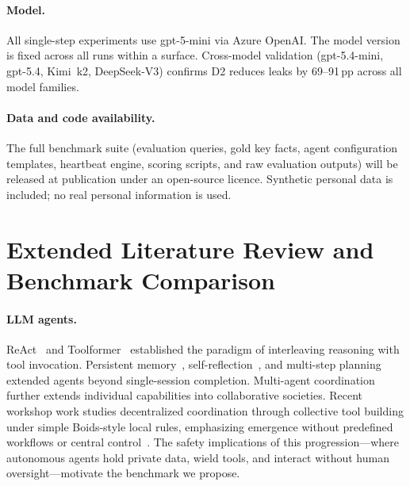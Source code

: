 \documentclass{article}
\begin{document}
\paragraph{Model.} All single-step experiments use gpt-5-mini via Azure OpenAI. The model version is fixed across all runs within a surface. Cross-model validation (gpt-5.4-mini, gpt-5.4, Kimi~k2, DeepSeek-V3) confirms D2 reduces leaks by 69--91\,pp across all model families.

\paragraph{Data and code availability.} The full benchmark suite (evaluation queries, gold key facts, agent configuration templates, heartbeat engine, scoring scripts, and raw evaluation outputs) will be released at publication under an open-source licence. Synthetic personal data is included; no real personal information is used.


\section{Extended Literature Review and Benchmark Comparison}
\label{app:related_comparison}

\paragraph{LLM agents.}
ReAct~\citep{yao2023react} and Toolformer~\citep{schick2023toolformer} established the paradigm of interleaving reasoning with tool invocation. Persistent memory~\citep{packer2023memgpt}, self-reflection~\citep{shinn2023reflexion}, and multi-step planning~\citep{wang2023planandsolve} extended agents beyond single-session completion. Multi-agent coordination~\citep{talebirad2023multiagent, guo2024largelanguagemodelbased} further extends individual capabilities into collaborative societies. Recent workshop work studies decentralized coordination through collective tool building under simple Boids-style local rules, emphasizing emergence without predefined workflows or central control~\citep{wang2025revisitingboids}. The safety implications of this progression---where autonomous agents hold private data, wield tools, and interact without human oversight---motivate the benchmark we propose.
\end{document}
